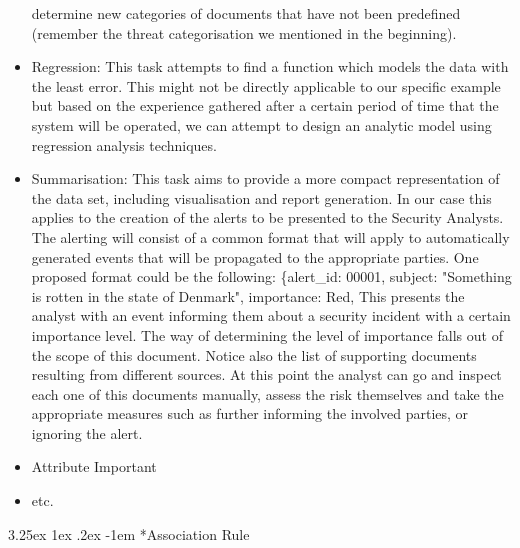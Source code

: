 \documentclass[12pt]{article}
\makeatletter
\newcounter{subsubsubsection}[subsubsection]
\renewcommand\paragraph{\@startsection{paragraph}{5}{\z@}%
  {3.25ex \@plus1ex \@minus.2ex}%
  {-1em}%
  {\normalfont\normalsize\bfseries}}
\makeatother
\begin{document}
\begin{itemize}
determine new categories of documents that have not been predefined (remember the threat
categorisation we mentioned in the beginning).
\item
Regression: This task attempts to find a function which models the data with the least error.
This might not be directly applicable to our specific example but based on the experience
gathered after a certain period of time that the system will be operated, we can attempt to
design an analytic model using regression analysis techniques.
\item
Summarisation: This task aims to provide a more compact representation of the data set,
including visualisation and report generation. In our case this applies to the creation of the
alerts to be presented to the Security Analysts. The alerting will consist of a common format
that will apply to automatically generated events that will be propagated to the appropriate
parties. One proposed format could be the following:
\{alert\_id: 00001, subject: "Something is rotten in the state of Denmark", importance: Red,
This presents the analyst with an event informing them about a security incident with a certain
importance level. The way of determining the level of importance falls out of the scope of this
document. Notice also the list of supporting documents resulting from different sources. At this
point the analyst can go and inspect each one of this documents manually, assess the risk
themselves and take the appropriate measures such as further informing the involved parties, or
ignoring the alert.
\item Attribute Important 
\item etc.
\end{itemize}
\paragraph*{Association Rule}
\end{document}
